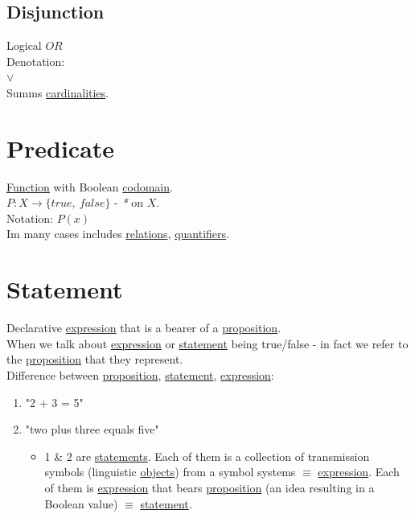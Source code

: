 \documentclass[a4paper,14pt,oneside]{book}
\begin{document}
{\subsection{\label{org66ac745}Disjunction}
\label{sec:orgc782e45}
Logical \(OR\)\\
Denotation:\\
\(\lor\)\\

Summs \hyperref[orgf89f526]{cardinalities}.\\

\section{\label{orga8f3cfc}Predicate}
\label{sec:org7f07220}
\hyperref[org6a60524]{Function} with Boolean \hyperref[org746d351]{codomain}.\\
\(P: X \to \{ true, \ false \}\) - \emph{*} on \(X\).\\

Notation: \(P(x)\)\\

Im many cases includes \hyperref[org7713e01]{relations}, \hyperref[org52e2af2]{quantifiers}.\\

\section{\label{org03c7362}Statement}
\label{sec:org77ee809}
Declarative \hyperref[org4f4ad69]{expression} that is a bearer of a \hyperref[org7fbfcf5]{proposition}.\\

When we talk about \hyperref[org4f4ad69]{expression} or \hyperref[org03c7362]{statement} being true/false - in fact we refer to the \hyperref[org7fbfcf5]{proposition} that they represent.\\

Difference between \hyperref[org7fbfcf5]{proposition}, \hyperref[org03c7362]{statement}, \hyperref[org4f4ad69]{expression}:\\
\begin{enumerate}
\item "2 + 3 = 5"\\
\item "two plus three equals five"\\

\begin{itemize}
\item 1 \& 2 are \hyperref[orgf6daaf5]{statements}. Each of them is a collection of transmission symbols (linguistic \hyperref[org7c09bf4]{objects}) from a symbol systems \(\equiv\) \hyperref[org4f4ad69]{expression}. Each of them is \hyperref[org4f4ad69]{expression} that bears \hyperref[org7fbfcf5]{proposition} (an idea resulting in a Boolean value) \(\equiv\) \hyperref[org03c7362]{statement}.\\


\end{itemize}
\end{enumerate}}
\end{document}
